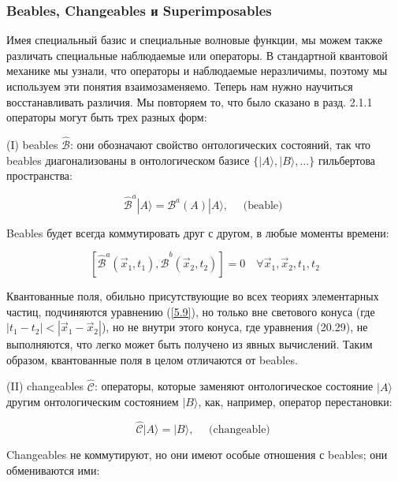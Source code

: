 \documentclass[main.tex]{subfiles}
\begin{document}
\subsubsection{Beables, Changeables и Superimposables}\label{ch5.5.1}

Имея специальный базис и специальные волновые функции, мы можем также различать специальные наблюдаемые или операторы. В стандартной квантовой механике мы узнали, что операторы и наблюдаемые неразличимы, поэтому мы используем эти понятия взаимозаменяемо. Теперь нам нужно научиться восстанавливать различия. Мы повторяем то, что было сказано в разд. 2.1.1 операторы могут быть трех разных форм:

(I) beables $\hat{\mathcal{B}}$: они обозначают свойство онтологических состояний, так что beables диагонализованы в онтологическом базисе $\{\mid A\rangle, \mid B\rangle,...\}$ гильбертова пространства:             

\begin{equation}\label{5.8}
	\hat{\mathcal{B}}^{a}|A\rangle=\mathcal{B}^{a}(A)|A\rangle, \quad \text { (beable) }
\end{equation}
                          
Beables будет всегда коммутировать друг с другом, в любые моменты времени:

\begin{equation}\label{5.9}
	\left[\hat{\mathcal{B}}^{a}\left(\vec{x}_{1}, t_{1}\right), \hat{\mathcal{B}}^{b}\left(\vec{x}_{2}, t_{2}\right)\right]=0 \quad \forall \vec{x}_{1}, \vec{x}_{2}, t_{1}, t_{2}
\end{equation}

Квантованные поля, обильно присутствующие во всех теориях элементарных частиц, подчиняются уравнению (\ref{5.9}), но только вне светового конуса (где $| t_1 - t_2 | <| \vec x_1 - \vec x_2 |$), но не внутри этого конуса, где уравнения (20.29), не выполняются, что легко может быть получено из явных вычислений. Таким образом, квантованные поля в целом отличаются от beables.

(II) changeables $\hat{\mathcal{C}}$: операторы, которые заменяют онтологическое состояние $\mid A\rangle$ другим онтологическим состоянием $\mid B\rangle$, как, например, оператор перестановки:  

\begin{equation}\label{5.10}
	\hat{\mathcal{C}}|A\rangle=|B\rangle, \quad \text { (changeable) }
\end{equation}         

Changeables не коммутируют, но они имеют особые отношения с beables; они обмениваются ими:
\end{document}
